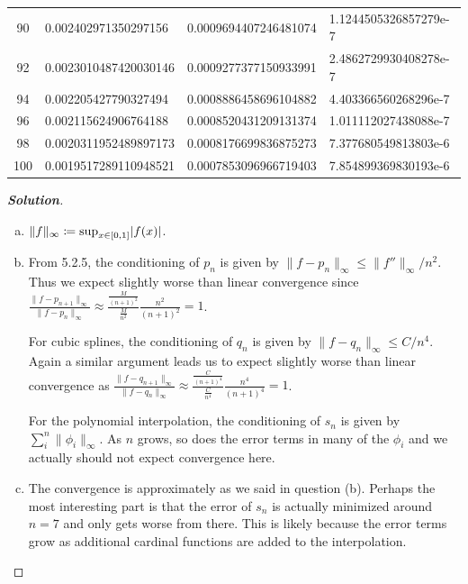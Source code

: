\documentclass[11pt]{article}
\DeclarePairedDelimiter{\abs}{\lvert}{\rvert}
\newenvironment{problem}[2][Question]{\begin{trivlist}
\item[\hskip \labelsep {\bfseries #1}\hskip \labelsep {\bfseries #2.}]}{\end{trivlist}}
\newenvironment{solution}{%
  \begin{proof}[\textbf{Solution}]$ $\par\nobreak\ignorespaces
}{%
  \end{proof}
}
\theoremstyle{definition}
\begin{document}
\begin{problem}{Q2}
\begin{enumerate}[(a)]
\begin{tabular}{| c | l | l | l | }
90 & 0.002402971350297156 & 0.0009694407246481074 & 1.1244505326857279e-7 \\ 
92 & 0.0023010487420030146 & 0.0009277377150933991 & 2.4862729930408278e-7 \\ 
94 & 0.002205427790327494 & 0.0008886458696104882 & 4.403366560268296e-7 \\ 
96 & 0.002115624906764188 & 0.0008520431209131374 & 1.011112027438088e-7 \\ 
98 & 0.0020311952489897173 & 0.0008176699836875273 & 7.377680549813803e-6 \\ 
100 & 0.0019517289110948521 & 0.0007853096966719403 & 7.854899369830193e-6 \\  \hline
\end{tabular}
\end{enumerate}
\end{problem}
\begin{solution}
\begin{enumerate}[(a)]
    \item $\|f\|_\infty \coloneq \sup_{x \in [0, 1]} \abs{f(x)}$.
    \item From 5.2.5, the conditioning of $p_n$ is given by $\|f - p_n\|_\infty \leq \|f''\|_\infty/n^2$. Thus we expect slightly worse than linear convergence since $\frac{\|f - p_{n+1}\|_\infty}{\|f - p_n\|_\infty} \approx \frac{\frac{M}{(n+1)^2}}{\frac{M}{n^2}}\frac{n^2}{(n+1)^2} = 1$.

    For cubic splines, the conditioning of $q_n$ is given by $\|f - q_n\|_\infty \leq C/n^4$. Again a similar argument leads us to expect slightly worse than linear convergence as $\frac{\|f - q_{n+1}\|_\infty}{\|f - q_n\|_\infty} \approx \frac{\frac{C}{(n+1)^4}}{\frac{C}{n^4}}\frac{n^4}{(n+1)^4} = 1$.

    For the polynomial interpolation, the conditioning of $s_n$ is given by $\sum_{i}^{n} \|\phi_i\|_\infty$. As $n$ grows, so does the error terms in many of the $\phi_i$ and we actually should not expect convergence here.
    \item The convergence is approximately as we said in question (b). Perhaps the most interesting part is that the error of $s_n$ is actually minimized around $n = 7$ and only gets worse from there. This is likely because the error terms grow as additional cardinal functions are added to the interpolation.
\end{enumerate}
\end{solution}
    
\end{document}
